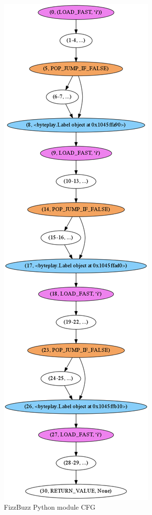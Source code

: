 \documentclass{icldt}
\numberwithin{equation}{section}       %
\begin{document}
{\begin{figure}[H]
	\centering
	\includegraphics[scale=.39]{img/fizzbuzz.png}
	\caption{FizzBuzz Python module CFG}
	\label{fig:fizzbuzz-cfg}
\end{figure}

}
\end{document}
